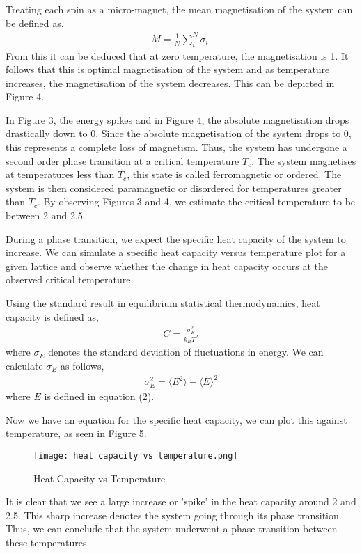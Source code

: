 \documentclass[a4paper]{article}
\begin{document}
Treating each spin as a micro-magnet, the mean magnetisation of the system can be defined as,
\begin{align*}
M = \frac{1}{N}\sum_{i}^{N} \sigma_{i} \
\end{align*}
From this it can be deduced that at zero temperature, the magnetisation is 1. It follows that this is optimal magnetisation of the system and as temperature increases, the magnetisation of the system decreases. This can be depicted in Figure 4.

In Figure 3, the energy spikes and in Figure 4, the absolute magnetisation drops drastically down to 0. Since the absolute magnetisation of the system drops to 0, this represents a complete loss of magnetism. Thus, the system has undergone a second order phase transition at a critical temperature $T_{c}$. The system magnetises at temperatures less than $T_{c}$, this state is called ferromagnetic or ordered. The system is then considered paramagnetic or disordered for temperatures greater than $T_{c}$. By observing Figures 3 and 4, we estimate the critical temperature to be between 2 and 2.5.

During a phase transition, we expect the specific heat capacity of the system to increase. We can simulate a specific heat capacity versus temperature plot for a given lattice and observe whether the change in heat capacity occurs at the observed critical temperature.

Using the standard result in equilibrium statistical thermodynamics, heat capacity is defined as,
\begin{align*}
C = \frac{\sigma_{E}^2}{k_{B}T^2}
\end{align*}
where $\sigma_{E}$ denotes the standard deviation of fluctuations in energy. We can calculate $\sigma_{E}$ as follows, 
\begin{align*}
\sigma_{E}^2 =  {\langle E^2\rangle} - {\langle E\rangle ^2}
\end{align*}
 where $E$ is defined in equation (2).
 
Now we have an equation for the specific heat capacity, we can plot this against temperature, as seen in Figure 5. 

\begin{figure}[h!]
  \texttt{[image: heat capacity vs temperature.png]}
  \caption{Heat Capacity vs Temperature}
  \label{fig:estimated_mean}
\end{figure} 

It is clear that we see a large increase or 'spike' in the heat capacity around 2 and 2.5. This sharp increase denotes the system going through its phase transition. Thus, we can conclude that the system underwent a phase transition between these temperatures. 
\end{document}
